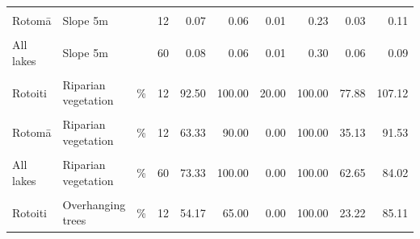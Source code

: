 \documentclass[
  12pt,
  a4paper,
  oneside]{scrbook}
\begin{document}
\begin{longtable}[t]{lllrrrrrrr}
\cellcolor{gray!8}{Rotoehu} & \cellcolor{gray!8}{Slope 5m} & \cellcolor{gray!8}{} & \cellcolor{gray!8}{12} & \cellcolor{gray!8}{0.08} & \cellcolor{gray!8}{0.06} & \cellcolor{gray!8}{0.02} & \cellcolor{gray!8}{0.27} & \cellcolor{gray!8}{0.03} & \cellcolor{gray!8}{0.12}\\
Rotomā & Slope 5m &  & 12 & 0.07 & 0.06 & 0.01 & 0.23 & 0.03 & 0.11\\
\addlinespace
\cellcolor{gray!8}{Ōkāreka} & \cellcolor{gray!8}{Slope 5m} & \cellcolor{gray!8}{} & \cellcolor{gray!8}{12} & \cellcolor{gray!8}{0.11} & \cellcolor{gray!8}{0.13} & \cellcolor{gray!8}{0.01} & \cellcolor{gray!8}{0.20} & \cellcolor{gray!8}{0.07} & \cellcolor{gray!8}{0.15}\\
All lakes & Slope 5m &  & 60 & 0.08 & 0.06 & 0.01 & 0.30 & 0.06 & 0.09\\
\cellcolor{gray!8}{Rotorua} & \cellcolor{gray!8}{Riparian vegetation} & \cellcolor{gray!8}{\%} & \cellcolor{gray!8}{12} & \cellcolor{gray!8}{67.50} & \cellcolor{gray!8}{100.00} & \cellcolor{gray!8}{0.00} & \cellcolor{gray!8}{100.00} & \cellcolor{gray!8}{40.12} & \cellcolor{gray!8}{94.88}\\
Rotoiti & Riparian vegetation & \% & 12 & 92.50 & 100.00 & 20.00 & 100.00 & 77.88 & 107.12\\
\cellcolor{gray!8}{Rotoehu} & \cellcolor{gray!8}{Riparian vegetation} & \cellcolor{gray!8}{\%} & \cellcolor{gray!8}{12} & \cellcolor{gray!8}{67.50} & \cellcolor{gray!8}{100.00} & \cellcolor{gray!8}{0.00} & \cellcolor{gray!8}{100.00} & \cellcolor{gray!8}{36.95} & \cellcolor{gray!8}{98.05}\\
\addlinespace
Rotomā & Riparian vegetation & \% & 12 & 63.33 & 90.00 & 0.00 & 100.00 & 35.13 & 91.53\\
\cellcolor{gray!8}{Ōkāreka} & \cellcolor{gray!8}{Riparian vegetation} & \cellcolor{gray!8}{\%} & \cellcolor{gray!8}{12} & \cellcolor{gray!8}{75.83} & \cellcolor{gray!8}{100.00} & \cellcolor{gray!8}{0.00} & \cellcolor{gray!8}{100.00} & \cellcolor{gray!8}{48.01} & \cellcolor{gray!8}{103.66}\\
All lakes & Riparian vegetation & \% & 60 & 73.33 & 100.00 & 0.00 & 100.00 & 62.65 & 84.02\\
\cellcolor{gray!8}{Rotorua} & \cellcolor{gray!8}{Overhanging trees} & \cellcolor{gray!8}{\%} & \cellcolor{gray!8}{12} & \cellcolor{gray!8}{46.67} & \cellcolor{gray!8}{30.00} & \cellcolor{gray!8}{0.00} & \cellcolor{gray!8}{100.00} & \cellcolor{gray!8}{15.50} & \cellcolor{gray!8}{77.83}\\
Rotoiti & Overhanging trees & \% & 12 & 54.17 & 65.00 & 0.00 & 100.00 & 23.22 & 85.11\\

\end{longtable}
\end{document}
